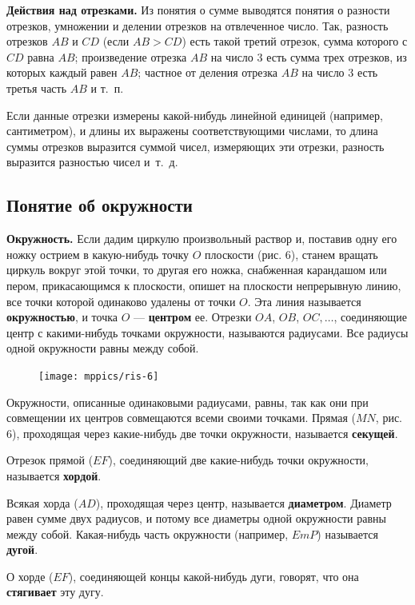 \documentclass[oneside]{book}
\begin{document}
\textbf{Действия над отрезками.}
Из понятия о сумме выводятся понятия о разности отрезков, умножении и делении отрезков на отвлеченное число.
Так, разность отрезков $AB$ и $CD$ (если $AB>CD$) есть такой третий отрезок, сумма которого с $CD$ равна $AB$;
произведение отрезка $AB$ на число 3 есть сумма трех отрезков, из которых каждый равен $AB$;
частное от деления отрезка $AB$ на число 3 есть третья часть $AB$ и т.~п.

Если данные отрезки измерены какой-нибудь линейной единицей (например, сантиметром), и длины их выражены соответствующими числами, то длина суммы отрезков выразится суммой чисел, измеряющих эти отрезки, разность выразится разностью чисел и~т.~д.

\subsection*{Понятие об окружности}

\textbf{Окружность.}
Если дадим циркулю произвольный раствор и, поставив одну его ножку острием в какую-нибудь точку $O$ плоскости (рис. 6), станем вращать циркуль вокруг этой точки, то другая его ножка, снабженная карандашом или пером, прикасающимся к плоскости, опишет на плоскости непрерывную линию, все точки которой одинаково удалены от точки $O$.
Эта линия называется \textbf{окружностью}, и точка $O$ — \textbf{центром} ее.
Отрезки $OA$, $OB$, $OC,\dots$, соединяющие центр с какими-нибудь точками окружности, называются радиусами.
Все радиусы одной окружности равны между собой.

\begin{figure}
\texttt{[image: mppics/ris-6]}
\caption{}
\end{figure}

Окружности, описанные одинаковыми радиусами, равны, так как они при совмещении их центров совмещаются всеми своими точками.
Прямая ($MN$, рис. 6), проходящая через какие-нибудь две точки окружности, называется \textbf{секущей}.

Отрезок прямой ($EF$), соединяющий две какие-нибудь точки окружности, называется \textbf{хордой}.

Всякая хорда ($AD$), проходящая через центр, называется \textbf{диаметром}.
Диаметр равен сумме двух радиусов, и потому все диаметры одной окружности равны между собой.
Какая-нибудь часть окружности (например, $EmP$) называется \textbf{дугой}.

О хорде ($EF$), соединяющей концы какой-нибудь дуги, говорят, что она \textbf{стягивает} эту дугу.
\end{document}
